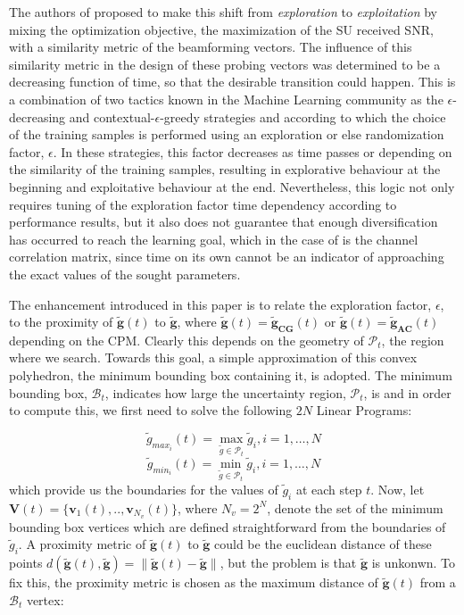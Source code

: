 \documentclass[journal]{IEEEtran}
\begin{document}
The authors of \cite{biban73} proposed to make this shift from \textit{exploration} to \textit{exploitation} by mixing the optimization objective, the maximization of the SU received SNR, with a similarity metric of the beamforming vectors. The influence of this similarity metric in the design of these probing vectors was determined to be a decreasing function of time, so that the desirable transition could happen. This is a combination of two tactics known in the Machine Learning community as the $\epsilon$-decreasing and contextual-$\epsilon$-greedy strategies \cite{biban90} and according to which the choice of the training samples is performed using an exploration or else randomization factor, $\epsilon$. In these strategies, this factor decreases as time passes or depending on the similarity of the training samples, resulting in explorative behaviour at the beginning and exploitative behaviour at the end. Nevertheless, this logic not only requires tuning of the exploration factor time dependency according to performance results, but it also does not guarantee that enough diversification has occurred to reach the learning goal, which in the case of \cite{biban73} is the channel correlation matrix, since time on its own cannot be an indicator of approaching the exact values of the sought parameters.

The enhancement introduced in this paper is to relate the exploration factor, $\epsilon$, to the proximity of $\mathbf{\tilde{g}}(t)$ to $\mathbf{\tilde{g}}$, where $\mathbf{\tilde{g}}(t)=\mathbf{\tilde{g}_{CG}}(t)$ or $\mathbf{\tilde{g}}(t)=\mathbf{\tilde{g}_{AC}}(t)$ depending on the CPM. Clearly this depends on the geometry of $\mathcal{P}_{t}$, the region where we search. Towards this goal, a simple approximation of this convex polyhedron, the minimum bounding box containing it, is adopted. The minimum bounding box, $\mathcal{B}_{t}$, indicates how large the uncertainty region, $\mathcal{P}_{t}$, is and in order to compute this, we first need to solve the following $2N$ Linear Programs:

\begin{equation}
\tilde{g}_{max_{i}}(t)=\max\limits_{\tilde{g} \in \mathcal{P}_{t}} \tilde{g}_{i},i = 1, \ldots, N
\label{eq16}
\end{equation}
\begin{equation}
\tilde{g}_{min_{i}}(t)=\min\limits_{\tilde{g} \in \mathcal{P}_{t}} \tilde{g}_{i},i = 1, \ldots, N
\label{eq17}
\end{equation}
which provide us the boundaries for the values of $\tilde{g}_{i}$ at each step $t$. Now, let $\mathbf{V}(t)=\{\mathbf{v}_{1}(t),..,\mathbf{v}_{N_{v}}(t)\}$, where $N_{v}=2^{N}$, denote the set of the minimum bounding box vertices which are defined straightforward from the boundaries of $\tilde{g}_{i}$. A proximity metric of $\mathbf{\tilde{g}}(t)$ to $\mathbf{\tilde{g}}$ could be the euclidean distance of these points $d(\mathbf{\tilde{g}}(t),\mathbf{\tilde{g}})=\lVert \mathbf{\tilde{g}}(t)-\mathbf{\tilde{g}} \rVert$, but the problem is that $\mathbf{\tilde{g}}$ is unkonwn. To fix this, the proximity metric is chosen as the maximum distance of $\mathbf{\tilde{g}}(t)$ from a $\mathcal{B}_{t}$ vertex:
\end{document}
